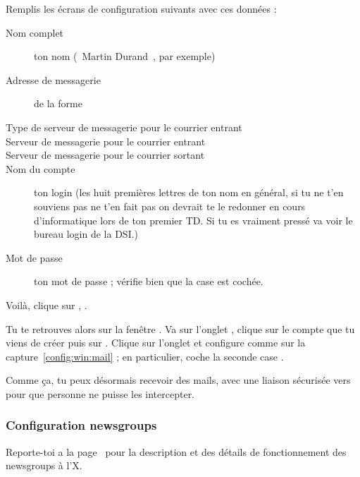 
\setcounter{page}{12}

Remplis les \'ecrans de configuration suivants avec ces donn\'ees :
\begin{description}
  \item[Nom complet] ton nom (\guillemotleft~Martin Durand~\guillemotright , par exemple)
  \item[Adresse de messagerie] de la forme 
  \item[Type de serveur de messagerie pour le courrier entrant] 
  \item[Serveur de messagerie pour le courrier entrant] 
  \item[Serveur de messagerie pour le courrier sortant] 
  \item[Nom du compte] ton login  (les huit premi\`eres lettres de ton nom en g\'en\'eral, si tu ne t'en souviens pas ne t'en fait pas on devrait te le redonner en cours d'informatique lors de ton premier TD. Si tu es vraiment press\'e va voir le bureau login de la DSI.)
  \item[Mot de passe] ton mot de passe  ;
       v\'erifie bien que la case  est coch\'ee.
\end{description}

Voil\`a, clique sur , .

Tu te retrouves alors sur la fen\^etre . Va sur
l'onglet , clique sur le compte que tu viens de cr\'eer
puis sur . Clique sur l'onglet  et
configure comme sur la capture~\ref{config:win:mail} ; en
particulier, coche la seconde case .

Comme \c{c}a, tu peux d\'esormais recevoir des mails, avec une liaison
s\'ecuris\'ee vers  pour que personne ne puisse les
intercepter.



\subsubsection{Configuration newsgroups}
Reporte-toi a la page~\pageref{newsgroups} pour la description et des d\'etails de fonctionnement des newsgroups \`a l'X.

